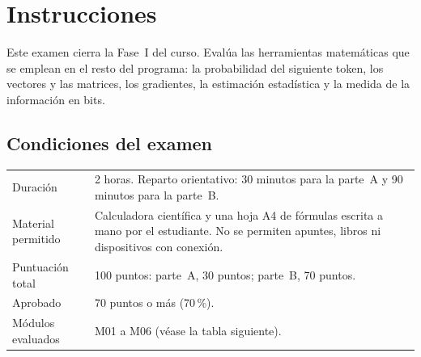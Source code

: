 \chapter*{Instrucciones}

Este examen cierra la Fase~I del curso. Evalúa las herramientas matemáticas que se emplean en el resto del programa: la probabilidad del siguiente token, los vectores y las matrices, los gradientes, la estimación estadística y la medida de la información en bits.

\section*{Condiciones del examen}
\begin{center}
\begin{tabularx}{\textwidth}{@{}lX@{}}
\toprule
Duración & 2 horas. Reparto orientativo: 30 minutos para la parte~A y 90 minutos para la parte~B. \\
Material permitido & Calculadora científica y una hoja A4 de fórmulas escrita a mano por el estudiante. No se permiten apuntes, libros ni dispositivos con conexión. \\
Puntuación total & 100 puntos: parte~A, 30 puntos; parte~B, 70 puntos. \\
Aprobado & 70 puntos o más (70\,\%). \\
Módulos evaluados & M01 a M06 (véase la tabla siguiente). \\
\bottomrule
\end{tabularx}
\end{center}

